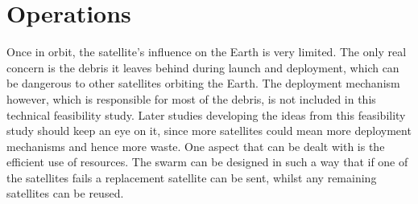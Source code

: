 \section{Operations}
\label{SSOPE}

Once in orbit, the satellite's influence on the Earth is very limited. The only real concern is the debris it leaves behind during launch and deployment, which can be dangerous to other satellites orbiting the Earth.
The deployment mechanism however, which is responsible for most of the debris, is not included in this technical feasibility study. Later studies developing the ideas from this feasibility study should keep an eye on it, since more satellites could mean more deployment mechanisms and hence more waste.
One aspect that can be dealt with is the efficient use of resources. The swarm can be designed in such a way that if one of the satellites fails a replacement satellite can be sent, whilst any remaining satellites can be reused.